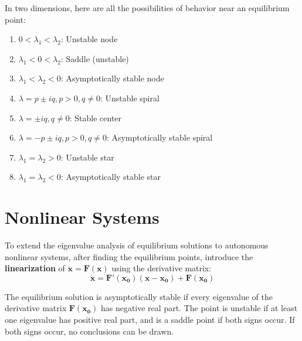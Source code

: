 \documentclass[11pt]{article}
\begin{document}
	In two dimensions, here are all the possibilities of behavior near an equilibrium point:
	\begin{enumerate}
		\item $0 < \lambda_1 < \lambda_2$: Unstable node
		\item $\lambda_1 < 0 < \lambda_2$: Saddle (unstable)
		\item $\lambda_1 < \lambda_2 < 0$: Asymptotically stable node
		\item $\lambda = p \pm iq, p>0, q \neq 0$: Unstable spiral
		\item $\lambda = \pm iq, q\neq 0$: Stable center
		\item $\lambda = -p \pm iq, p > 0, q \neq 0$: Asymptotically stable spiral
		\item $\lambda_1 = \lambda_2 > 0$: Unstable star
		\item $\lambda_1 = \lambda_2 < 0$: Asymptotically stable star
	\end{enumerate}
	
	
	\section{Nonlinear Systems} 
	To extend the eigenvalue analysis of equilibrium solutions to autonomous nonlinear systems, after finding the equilibrium points, introduce the \textbf{linearization} of $\dot{\mathbf{x}} = \mathbf{F}(\mathbf{x})$ using the derivative matrix:
	\begin{equation}
		\dot{\mathbf{x}} = \mathbf{F'}(\mathbf{x_0})(\mathbf{x} - \mathbf{x_0}) + \mathbf{F}(\mathbf{x_0})
	\end{equation}
	
	The equilibrium solution is asymptotically stable if every eigenvalue of the derivative matrix $\mathbf{F}(\mathbf{x_0})$ has negative real part. The point is unstable if at least one eigenvalue has positive real part, and is a saddle point if both signs occur. If both signs occur, no conclusions can be drawn.

%		
%		


\end{document}
